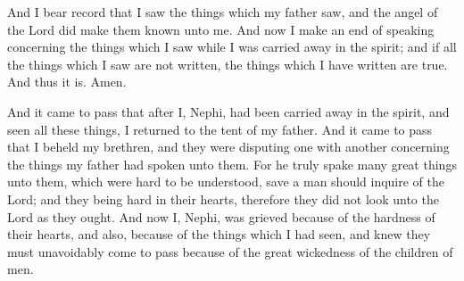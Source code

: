 \bverse \iffalse And I bear record that I saw the things which my father saw, and the angel of the Lord did make them known unto me. \fi
And I bear record that I saw the things which my father saw, and the angel of the Lord did make them known unto me.
\bverse \iffalse And now I make an end of speaking concerning the things which I saw while I was carried away in the spirit; and if all the things which I saw are not written, the things which I have written are true. And thus it is. Amen. \fi
And now I make an end of speaking concerning the things which I saw while I was carried away in the spirit; and if all the things which I saw are not written, the things which I have written are true. And thus it is. Amen.

\bchapter
\bverse \iffalse And it came to pass that after I, Nephi, had been carried away in the spirit, and seen all these things, I returned to the tent of my father. \fi
And it came to pass that after I, Nephi, had been carried away in the spirit, and seen all these things, I returned to the tent of my father.
\bverse \iffalse And it came to pass that I beheld my brethren, and they were disputing one with another concerning the things my father had spoken unto them. \fi
And it came to pass that I beheld my brethren, and they were disputing one with another concerning the things my father had spoken unto them.
\bverse \iffalse For he truly spake many great things unto them, which were hard to be understood, save a man should inquire of the Lord; and they being hard in their hearts, therefore they did not look unto the Lord as they ought. \fi
For he truly spake many great things unto them, which were hard to be understood, save a man should inquire of the Lord; and they being hard in their hearts, therefore they did not look unto the Lord as they ought.
\bverse \iffalse And now I, Nephi, was grieved because of the hardness of their hearts, and also, because of the things which I had seen, and knew they must unavoidably come to pass because of the great wickedness of the children of men. \fi
And now I, Nephi, was grieved because of the hardness of their hearts, and also, because of the things which I had seen, and knew they must unavoidably come to pass because of the great wickedness of the children of men.
\bverse \iffalse And it came to pass that I was overcome because of my afflictions, for I considered that mine afflictions were great above all, because of the destruction of my people, for I had beheld their fall. \fi

